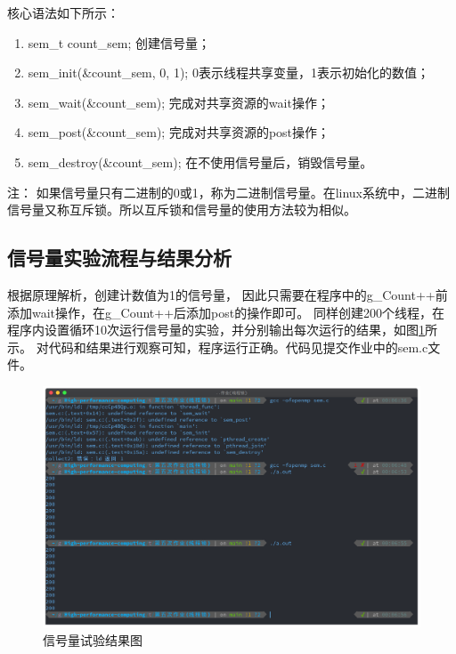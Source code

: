 \documentclass[11pt]{ctexart}
\newenvironment{note}{\kaishu 注：}{}
\begin{document}
核心语法如下所示：
\begin{enumerate}
    \item {\ttfamily sem\_t count\_sem;} 创建信号量；
    \item {\ttfamily sem\_init(\&count\_sem, 0, 1);} 0表示线程共享变量，1表示初始化的数值；
    \item {\ttfamily sem\_wait(\&count\_sem);} 完成对共享资源的{\ttfamily wait}操作；
    \item {\ttfamily sem\_post(\&count\_sem);} 完成对共享资源的{\ttfamily post}操作；
    \item {\ttfamily sem\_destroy(\&count\_sem);} 在不使用信号量后，销毁信号量。
\end{enumerate}

\begin{note}
    如果信号量只有二进制的0或1，称为二进制信号量。在linux系统中，二进制信号量又称互斥锁。所以互斥锁和信号量的使用方法较为相似。
\end{note}

\subsection{信号量实验流程与结果分析}
根据原理解析，创建计数值为1的信号量，
因此只需要在程序中的{\ttfamily g\_Count++}前添加{\ttfamily wait}操作，在{\ttfamily g\_Count++}后添加{\ttfamily post}的操作即可。
同样创建200个线程，在程序内设置循环10次运行信号量的实验，并分别输出每次运行的结果，如图\ref{sem}所示。
对代码和结果进行观察可知，程序运行正确。代码见提交作业中的{\ttfamily sem.c}文件。
 
\begin{figure}[ht]
    \centering
    \includegraphics[scale=0.35]{../sem.png}
    \caption{信号量试验结果图}
    \label{sem}
\end{figure}
\end{document}

